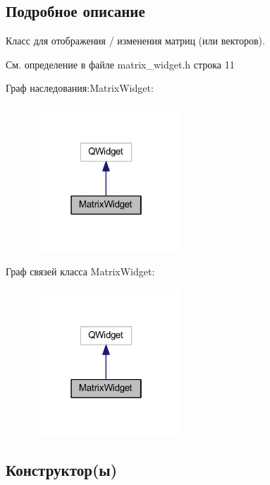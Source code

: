 \subsection{Подробное описание}
Класс для отображения / изменения матриц (или векторов). 

См. определение в файле matrix\+\_\+widget.\+h строка 11



Граф наследования\+:Matrix\+Widget\+:
\nopagebreak
\begin{figure}[H]
\begin{center}
\leavevmode
\includegraphics[width=154pt]{class_matrix_widget__inherit__graph}
\end{center}
\end{figure}


Граф связей класса Matrix\+Widget\+:
\nopagebreak
\begin{figure}[H]
\begin{center}
\leavevmode
\includegraphics[width=154pt]{class_matrix_widget__coll__graph}
\end{center}
\end{figure}


\subsection{Конструктор(ы)}
\hypertarget{class_matrix_widget_a127414cc00d40d2b62721bcf49286c89}{}\label{class_matrix_widget_a127414cc00d40d2b62721bcf49286c89} 
